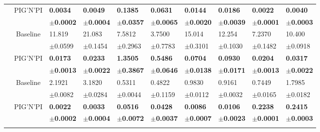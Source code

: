 \documentclass{article}
\newcommand{\pignpi}{PIG'N'PI\xspace}
\begin{document}
\begin{table}[H]
{\begin{tabularx}{\textwidth}{ccXXXXXXXX}
        & \multirow{2}{*}{\pignpi}
        & \textbf{0.0034} & \textbf{0.0049} & \textbf{0.1385} & \textbf{0.0631} & \textbf{0.0144} & \textbf{0.0186} & \textbf{0.0022} & \textbf{0.0040}\\
        && \scriptsize \textbf{$\pm$0.0002} & \scriptsize \textbf{$\pm$0.0004} & \scriptsize \textbf{$\pm$0.0357} & \scriptsize \textbf{$\pm$0.0065} & \scriptsize \textbf{$\pm$0.0020} & \scriptsize \textbf{$\pm$0.0039} & \scriptsize \textbf{$\pm$0.0001} & \scriptsize \textbf{$\pm$0.0003}\\
        \hline\rule{0pt}{2.3ex}
        
        \multirow{4}{*}{\textsf{MAE\textsubscript{nf}}}
        & \multirow{2}{*}{Baseline} 
        & 11.819 & 21.083 & 7.5812 & 3.7500 & 15.014 & 12.254 & 7.2370 & 10.400\\
        &&\scriptsize$\pm$0.0599 & \scriptsize $\pm$0.1454 & \scriptsize $\pm$0.2963 & \scriptsize $\pm$0.7783 & \scriptsize $\pm$0.3101 & \scriptsize $\pm$0.1030 & \scriptsize $\pm$0.1482 & \scriptsize $\pm$0.0918\\
        \cline{3-10}\rule{0pt}{2.3ex}

        & \multirow{2}{*}{\pignpi}
        & \textbf{0.0173} & \textbf{0.0233} & \textbf{1.3505} & \textbf{0.5486} & \textbf{0.0704} & \textbf{0.0930} & \textbf{0.0204} & \textbf{0.0317}\\
        && \scriptsize \textbf{$\pm$0.0013} & \scriptsize \textbf{$\pm$0.0022} & \scriptsize \textbf{$\pm$0.3867} & \scriptsize \textbf{$\pm$0.0646} & \scriptsize \textbf{$\pm$0.0138} & \scriptsize \textbf{$\pm$0.0171} & \scriptsize \textbf{$\pm$0.0013} & \scriptsize \textbf{$\pm$0.0022}\\
        \hline\rule{0pt}{2.3ex}
        
        \multirow{4}{*}{\textsf{MAE\textsubscript{$\Delta$ep}}}
        & \multirow{2}{*}{Baseline} 
        & 2.1921 & 3.1820 & 0.5311 & 0.4822 & 0.9830 & 0.9161 & 0.7449 & 1.7985\\
        &&\scriptsize$\pm$0.0082 & \scriptsize $\pm$0.0284 & \scriptsize $\pm$0.0044 & \scriptsize $\pm$0.1159 & \scriptsize $\pm$0.0112 & \scriptsize $\pm$0.0032 & \scriptsize $\pm$0.0165 & \scriptsize $\pm$0.0182\\
        \cline{3-10}\rule{0pt}{2.3ex}

        & \multirow{2}{*}{\pignpi}
        & \textbf{0.0022} & \textbf{0.0033} & \textbf{0.0516} & \textbf{0.0428} & \textbf{0.0086} & \textbf{0.0106} & \textbf{0.2238} & \textbf{0.2415}\\
        && \scriptsize \textbf{$\pm$0.0002} & \scriptsize \textbf{$\pm$0.0004} & \scriptsize \textbf{$\pm$0.0072} & \scriptsize \textbf{$\pm$0.0037} & \scriptsize \textbf{$\pm$0.0007} & \scriptsize \textbf{$\pm$0.0023} & \scriptsize \textbf{$\pm$0.0001} & \scriptsize \textbf{$\pm$0.0003}\\
    \hline\rule{0pt}{2.3ex}
        

\end{tabularx}}
\end{table}
\end{document}

